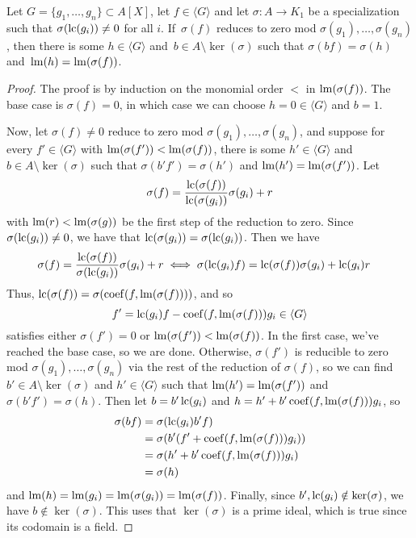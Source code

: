 \begin{lemma}\label{lem:div_to_ps_div}
  Let $G = \{g_{1}, \dots, g_{n}\} \subset A[X]$, let $f \in \langle G \rangle$ and let $\sigma : A \to K_{1}$ be a specialization such that $\sigma(\operatorname{lc}(g_{i})) \neq 0$ for all $i$. If $\,\sigma(f)$ reduces to zero mod $\sigma(g_{1}), \dots, \sigma(g_{n})$, then there is some $h \in \langle G \rangle$ and $\,b \in A \setminus \ker(\sigma)$ such that $\sigma(bf) = \sigma(h)$ and $\,\operatorname{lm}(h) = \operatorname{lm}(\sigma(f))$.
\end{lemma}
\begin{proof}
  The proof is by induction on the monomial order $<$ in $\operatorname{lm}(\sigma(f))$. The base case is $\sigma(f) = 0$, in which case we can choose $h = 0 \in \langle G \rangle$ and $b = 1$.

  Now, let $\sigma(f) \neq 0$ reduce to zero mod $\sigma(g_{1}), \dots, \sigma(g_{n})$, and suppose for every $f' \in \langle G \rangle$ with $\operatorname{lm}(\sigma(f')) < \operatorname{lm}(\sigma(f))$, there is some $h' \in \langle G \rangle$ and $b \in A \setminus \ker(\sigma)$ such that $\sigma(b'f') = \sigma(h')$ and $\operatorname{lm}(h') = \operatorname{lm}(\sigma(f'))$. Let
  \[\sigma(f) = \frac{\operatorname{lc}(\sigma(f))}{\operatorname{lc}(\sigma(g_{i}))} \sigma(g_{i}) + r\]
  with $\operatorname{lm}(r) < \operatorname{lm}(\sigma(g))$ be the first step of the reduction to zero. Since $\sigma(\operatorname{lc}(g_{i})) \neq 0$, we have that $\operatorname{lc}(\sigma(g_{i})) = \sigma(\operatorname{lc}(g_{i}))$. Then we have
  \begin{align*}
    \sigma(f) &= \frac{\operatorname{lc}(\sigma(f))}{\sigma(\operatorname{lc}(g_{i}))} \sigma(g_{i}) + r \iff \sigma(\operatorname{lc}(g_{i}) f) = \operatorname{lc}(\sigma(f)) \sigma(g_{i}) + \operatorname{lc}(g_{i})r
  \end{align*}
  Thus, $\operatorname{lc}(\sigma(f)) = \sigma(\operatorname{coef}(f, \operatorname{lm}(\sigma(f))))$, and so
  \[f' = \operatorname{lc}(g_{i})f - \operatorname{coef}(f, \operatorname{lm}(\sigma(f))) g_{i} \in \langle G \rangle\]
  satisfies either $\sigma(f') = 0$ or $\operatorname{lm}(\sigma(f')) < \operatorname{lm}(\sigma(f))$. In the first case, we've reached the base case, so we are done. Otherwise, $\sigma(f')$ is reducible to zero mod $\sigma(g_{1}), \dots, \sigma(g_{n})$ via the rest of the reduction of $\sigma(f)$, so we can find $b' \in A \setminus \ker(\sigma)$ and $h' \in \langle G \rangle$ such that $\operatorname{lm}(h') = \operatorname{lm}(\sigma(f'))$ and $\sigma(b' f') = \sigma(h)$. Then let $b = b' \operatorname{lc}(g_{i})$ and $h = h' + b' \operatorname{coef}(f, \operatorname{lm}(\sigma(f))) g_{i}$, so
  \begin{align*}
    \sigma(b f) &= \sigma(\operatorname{lc}(g_{i}) b' f) \\
           &= \sigma(b' (f' + \operatorname{coef}(f, \operatorname{lm}(\sigma(f))) g_{i})) \\
           &= \sigma(h' + b' \operatorname{coef}(f, \operatorname{lm}(\sigma(f))) g_{i}) \\
           &= \sigma(h)
  \end{align*}
  and $\operatorname{lm}(h) = \operatorname{lm}(g_{i}) = \operatorname{lm}(\sigma(g_{i})) = \operatorname{lm}(\sigma(f))$. Finally, since $b', \operatorname{lc}(g_{i}) \notin \ker(\sigma)$, we have $b \notin \ker(\sigma)$. This uses that $\ker(\sigma)$ is a prime ideal, which is true since its codomain is a field.
\end{proof}














